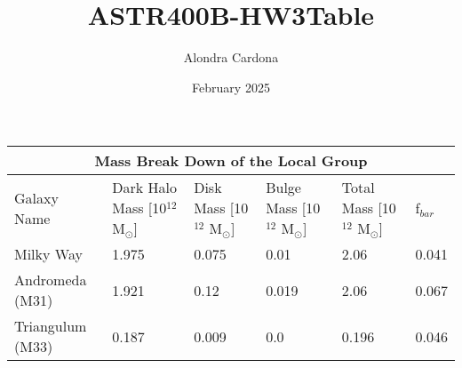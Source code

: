 \documentclass{article}
\title{ASTR400B-HW3Table}
\author{Alondra Cardona}
\date{February 2025}
\begin{document}
\maketitle

\begin{longtable}{ |p{2.2cm}|p{2.5cm}|p{2.2cm}|p{2.2cm}|p{2.2cm}|p{1cm}|}
 \hline
 \multicolumn{6}{|c|}{Mass Break Down of the Local Group} \\
 \hline
 Galaxy Name & Dark Halo Mass [10$^{12}$ M$_{\odot}$] & Disk Mass [10$^{12}$ M$_{\odot}$] & Bulge Mass [10$^{12}$ M$_{\odot}$] & Total Mass [10$^{12}$ M$_{\odot}$] & f$_{bar}$ \\
 \hline
 Milky Way & 1.975 & 0.075 & 0.01 & 2.06 & 0.041\\
 \hline
 Andromeda (M31) & 1.921 & 0.12 & 0.019 & 2.06 & 0.067\\
 \hline
 Triangulum (M33) & 0.187 & 0.009 & 0.0 & 0.196 & 0.046\\
\hline
\end{longtable}
\end{document}
